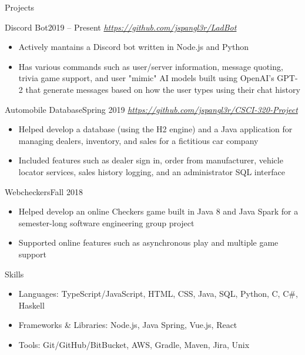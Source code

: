 \documentclass[]{mcdowellcv}
\begin{document}
	\begin{cvsection}{Projects}
		\begin{cvsubsection}{Discord Bot}{}{2019 -- Present}
			\textit{\url{https://github.com/jspangl3r/LadBot}}
			\begin{itemize}
				\item Actively mantains a Discord bot written in Node.js and Python
				\item Has various commands such as user/server information, message quoting, trivia game support, and user "mimic" AI models built using OpenAI's GPT-2 that generate messages based on how the user types using their chat history
			\end{itemize}
		\end{cvsubsection}

		\begin{cvsubsection}{Automobile Database}{}{Spring 2019}
			\textit{\url{https://github.com/jspangl3r/CSCI-320-Project}}
			\begin{itemize}
				\item Helped develop a database (using the H2 engine) and a Java application for managing dealers, inventory, and sales for a fictitious car company
				\item Included features such as dealer sign in, order from manufacturer, vehicle locator services, sales history logging, and an administrator SQL interface
			\end{itemize}
		\end{cvsubsection}

		\begin{cvsubsection}{Webcheckers}{}{Fall 2018}
			\begin{itemize}
				\item Helped develop an online Checkers game built in Java 8 and Java Spark for a semester-long software engineering group project
				\item Supported online features such as asynchronous play and multiple game support
			\end{itemize}
		\end{cvsubsection}
	\end{cvsection}
	
	\begin{cvsection}{Skills}
		\begin{cvsubsection}{}{}{}	
			\begin{itemize}
				\item Languages: TypeScript/JavaScript, HTML, CSS, Java, SQL, Python, C, C\#, Haskell
				\item Frameworks \& Libraries: Node.js, Java Spring, Vue.js, React
				\item Tools: Git/GitHub/BitBucket, AWS, Gradle, Maven, Jira, Unix
			\end{itemize}
		\end{cvsubsection}
	\end{cvsection}
	
\end{document}
